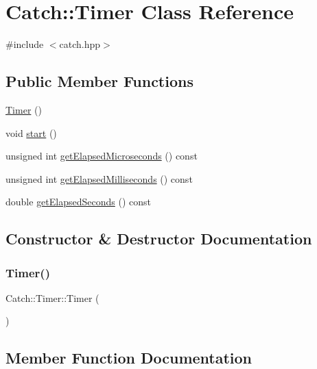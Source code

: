 \hypertarget{class_catch_1_1_timer}{}\section{Catch\+:\+:Timer Class Reference}
\label{class_catch_1_1_timer}


{\ttfamily \#include $<$catch.\+hpp$>$}

\subsection*{Public Member Functions}
\begin{DoxyCompactItemize}
\item 
\hyperlink{class_catch_1_1_timer_af09b7cd7a40af71f4704262afb31558a}{Timer} ()
\item 
void \hyperlink{class_catch_1_1_timer_a0a56e879e43f36c102bf9ea8b5fc8b72}{start} ()
\item 
unsigned int \hyperlink{class_catch_1_1_timer_af592ca4a9d340b9855732e4af777eaf0}{get\+Elapsed\+Microseconds} () const
\item 
unsigned int \hyperlink{class_catch_1_1_timer_a2081b2d36950ab6912e7c4958afe0099}{get\+Elapsed\+Milliseconds} () const
\item 
double \hyperlink{class_catch_1_1_timer_ae1615c8a9aa44b7a96cfe8a35d34e5de}{get\+Elapsed\+Seconds} () const
\end{DoxyCompactItemize}


\subsection{Constructor \& Destructor Documentation}
\mbox{\label{class_catch_1_1_timer_af09b7cd7a40af71f4704262afb31558a}} 
\subsubsection{\texorpdfstring{Timer()}{Timer()}}
{\footnotesize\ttfamily Catch\+::\+Timer\+::\+Timer (\begin{DoxyParamCaption}{ }\end{DoxyParamCaption})\hspace{0.3cm}{\ttfamily [inline]}}



\subsection{Member Function Documentation}
\mbox{\label{class_catch_1_1_timer_af592ca4a9d340b9855732e4af777eaf0}} 
